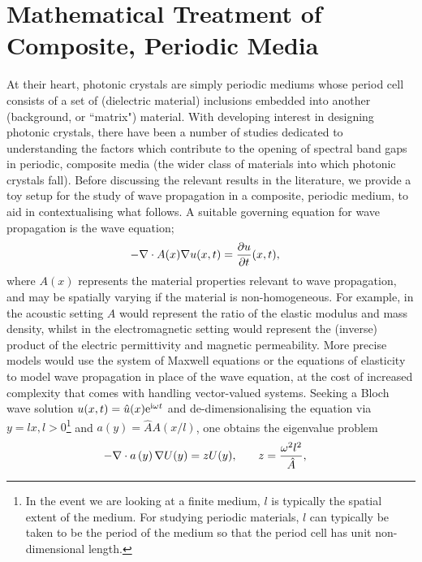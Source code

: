 \section{Mathematical Treatment of Composite, Periodic Media} \label{sec:MathHomLR}

At their heart, photonic crystals are simply periodic mediums whose period cell consists of a set of (dielectric material) inclusions embedded into another (background, or ``matrix") material.
With developing interest in designing photonic crystals, there have been a number of studies dedicated to understanding the factors which contribute to the opening of spectral band gaps in periodic, composite media (the wider class of materials into which photonic crystals fall).
Before discussing the relevant results in the literature, we provide a toy setup for the study of wave propagation in a composite, periodic medium, to aid in contextualising what follows.
A suitable governing equation for wave propagation is the wave equation;
\begin{align*}
	-\nabla\cdot A(x)\nabla u(x,t) &= \dfrac{\partial u}{\partial t}(x,t),
\end{align*}
where $A(x)$ represents the material properties relevant to wave propagation, and may be spatially varying if the material is non-homogeneous.
For example, in the acoustic setting $A$ would represent the ratio of the elastic modulus and mass density, whilst in the electromagnetic setting would represent the (inverse) product of the electric permittivity and magnetic permeability.
More precise models would use the system of Maxwell equations or the equations of elasticity to model wave propagation in place of the wave equation, at the cost of increased complexity that comes with handling vector-valued systems.
Seeking a Bloch wave solution $u(x,t) = \hat{u}(x)\mathrm{e}^{\mathrm{i}\omega t}$ and de-dimensionalising the equation via $y=lx, l>0$\footnote{In the event we are looking at a finite medium, $l$ is typically the spatial extent of the medium. For studying periodic materials, $l$ can typically be taken to be the period of the medium so that the period cell has unit non-dimensional length.} and $a(y) = \hat{A}A(x/l)$, one obtains the eigenvalue problem
\begin{align*}
	-\nabla\cdot a\left( y \right)\nabla U(y) = z U(y),
	&\qquad 
	z = \frac{\omega^2 l^2}{\hat{A}},
\end{align*}
